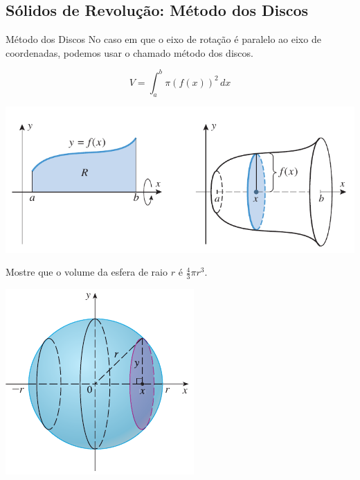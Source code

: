 \subsection*{Sólidos de Revolução: Método dos Discos}
\begin{frame}{Método dos Discos}
No caso em que o eixo de rotação é {\color{blue}paralelo} ao eixo de coordenadas, podemos usar o chamado {\color{blue} método dos discos}.

\[V=\int_a^b \pi \left(f(x)\right)^2\,dx\]

\begin{center}
\includegraphics[scale=.4]{figuras/discos1.png}
\end{center}
\end{frame}

\begin{frame}
\begin{exe}
Mostre que o volume da esfera de raio $r$ é $\frac{4}{3}\pi r^3$.
\end{exe}

\begin{center}
\includegraphics[scale=.7]{figuras/esfera.png}
\end{center}
\end{frame}

